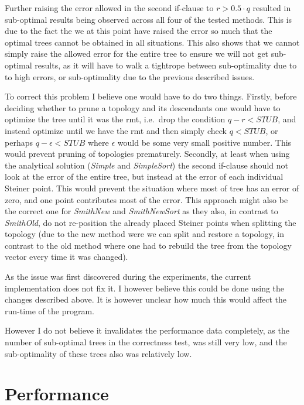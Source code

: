 Further raising the error allowed in the second if-clause to $r > 0.5 \cdot q$
resulted in sub-optimal results being observed across all four of the tested
methods. This is due to the fact the we at this point have raised the error so
much that the optimal trees cannot be obtained in all situations. This also
shows that we cannot simply raise the allowed error for the entire tree to
ensure we will not get sub-optimal results, as it will have to walk a tightrope
between sub-optimality due to to high errors, or sub-optimality due to the
previous described issues.

To correct this problem I believe one would have to do two things. Firstly,
before deciding whether to prune a topology and its descendants one would have
to optimize the tree until it was the \ac{rmt}, i.e.\ drop the condition $q-r <
\textit{STUB}$, and instead optimize until we have the \ac{rmt} and then simply
check $q < \textit{STUB}$, or perhaps $q - \epsilon < \textit{STUB}$ where
$\epsilon$ would be some very small positive number. This would prevent pruning
of topologies prematurely. Secondly, at least when using the analytical solution
(\textit{Simple} and \textit{SimpleSort}) the second if-clause should not look
at the error of the entire tree, but instead at the error of each individual
Steiner point. This would prevent the situation where most of tree has an error
of zero, and one point contributes most of the error. This approach might also
be the correct one for \textit{SmithNew} and \textit{SmithNewSort} as they also, in
contrast to \textit{SmithOld}, do not re-position the already placed Steiner
points when splitting the topology (due to the new method were we can split and
restore a topology, in contrast to the old method where one had to rebuild the
tree from the topology vector every time it was changed).

As the issue was first discovered during the experiments, the current
implementation does not fix it. I however believe this could be done using the
changes described above. It is however unclear how much this would affect the
run-time of the program.

However I do not believe it invalidates the performance data completely, as the
number of sub-optimal trees in the correctness test, was still very low, and the
sub-optimality of these trees also was relatively low.

\section{Performance}
\label{sec:performance}

